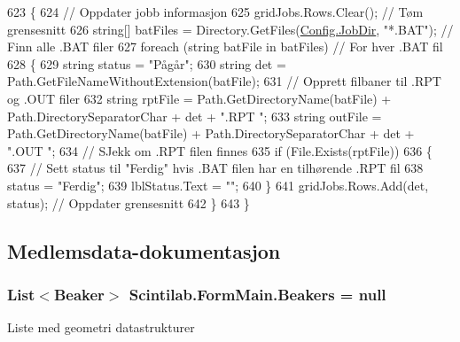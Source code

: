 \begin{DoxyCode}
623         \{
624             \textcolor{comment}{// Oppdater jobb informasjon}
625             gridJobs.Rows.Clear(); \textcolor{comment}{// Tøm grensesnitt}
626             \textcolor{keywordtype}{string}[] batFiles = Directory.GetFiles(\hyperlink{class_scintilab_1_1_config_a0810c3c214672429b456af8f77e98632}{Config.JobDir}, \textcolor{stringliteral}{"*.BAT"}); \textcolor{comment}{// Finn alle .BAT
       filer}
627             \textcolor{keywordflow}{foreach} (\textcolor{keywordtype}{string} batFile \textcolor{keywordflow}{in} batFiles) \textcolor{comment}{// For hver .BAT fil}
628             \{
629                 \textcolor{keywordtype}{string} status = \textcolor{stringliteral}{"Pågår"};
630                 \textcolor{keywordtype}{string} det = Path.GetFileNameWithoutExtension(batFile);
631                 \textcolor{comment}{// Opprett filbaner til .RPT og .OUT filer}
632                 \textcolor{keywordtype}{string} rptFile = Path.GetDirectoryName(batFile) + Path.DirectorySeparatorChar + det + \textcolor{stringliteral}{".RPT
      "};
633                 \textcolor{keywordtype}{string} outFile = Path.GetDirectoryName(batFile) + Path.DirectorySeparatorChar + det + \textcolor{stringliteral}{".OUT
      "};
634                 \textcolor{comment}{// SJekk om .RPT filen finnes}
635                 \textcolor{keywordflow}{if} (File.Exists(rptFile))
636                 \{
637                     \textcolor{comment}{// Sett status til "Ferdig" hvis .BAT filen har en tilhørende .RPT fil}
638                     status = \textcolor{stringliteral}{"Ferdig"};
639                     lblStatus.Text = \textcolor{stringliteral}{""};
640                 \}
641                 gridJobs.Rows.Add(det, status); \textcolor{comment}{// Oppdater grensesnitt}
642             \}
643         \}
\end{DoxyCode}


\subsection{Medlemsdata-\/dokumentasjon}
\hypertarget{class_scintilab_1_1_form_main_aaff2cbfd906f576997bce08ece74dae8}{
\subsubsection[{Beakers}]{\setlength{\rightskip}{0pt plus 5cm}List$<${\bf Beaker}$>$ Scintilab.\+Form\+Main.\+Beakers = null\hspace{0.3cm}{\ttfamily [private]}}}\label{class_scintilab_1_1_form_main_aaff2cbfd906f576997bce08ece74dae8}
Liste med geometri datastrukturer 

